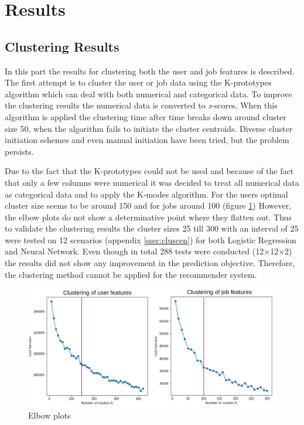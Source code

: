 \section{Results}
\label{sec:rslts}


\subsection{Clustering Results}
\label{ssec:clures}
In this part the results for clustering both the user and job features is described.
The first attempt is to cluster the user or job data using the K-prototypes algorithm which can deal with both numerical and categorical data. 
To improve the clustering results the numerical data is converted to \textit{z}-scores.
When this algorithm is applied the clustering time after time breaks down around cluster size 50, when the algorithm fails to initiate the cluster centroids. 
Diverse cluster initiation schemes and even manual initiation have been tried, but the problem persists. 

Due to the fact that the K-prototypes could not be used and because of the fact that only a few columns were numerical it was decided to treat all numerical data as categorical data and to apply the K-modes algorithm.
For the users optimal cluster size seems to be around 150 and for jobs around 100 (figure \ref{fig:eb})
However, the elbow plots do not show a determinative point where they flatten out.
Thus to validate the clustering results the cluster sizes 25 till 300 with an interval of 25 were tested on 12 scenarios (appendix \ref{ssec:cluscen}) for both Logistic Regression and Neural Network.
Even though in total 288 tests were  conducted (12$\times$12$\times$2) the results did not show any improvement in the prediction objective. 
Therefore, the clustering method cannot be applied for the recommender system.

\begin{figure}[H]
    \centering
    \includegraphics[width=\linewidth]{ThesisTemplate/Images/Clustering.png}
    \caption{\label{fig:eb} Elbow plots}
\end{figure}

